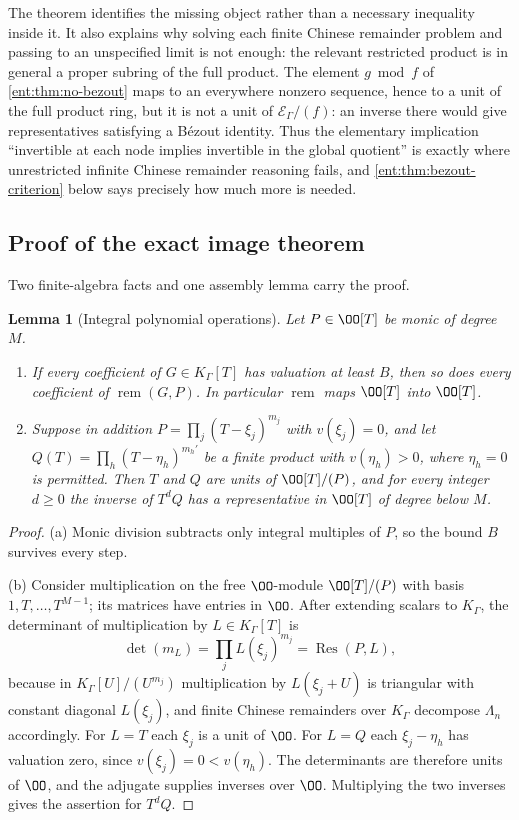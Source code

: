 \documentclass[11pt]{article}
\theoremstyle{plain}
\newtheorem{lemma}[lemma]{Lemma}
\theoremstyle{plain}
\theoremstyle{plain}
\theoremstyle{definition}
\theoremstyle{definition}
\theoremstyle{definition}
\theoremstyle{definition}
\theoremstyle{remark}
\newcommand{\K}{K_\Gamma}\newcommand{\KD}{K_\Delta}
\newcommand{\E}{\mathcal E_\Gamma}
\DeclareMathOperator{\remp}{rem}\DeclareMathOperator{\Res}{Res}
\begin{document}
The theorem identifies the missing object rather than a necessary inequality
inside it. It also explains why solving each finite Chinese remainder problem
and passing to an unspecified limit is not enough: the relevant restricted
product is in general a proper subring of the full product. The element
$g\bmod f$ of \cref{ent:thm:no-bezout} maps to an everywhere nonzero
sequence, hence to a unit of the full product ring, but it is not a unit of
$\E/(f)$: an inverse there would give representatives satisfying a B\'ezout
identity. Thus the elementary implication ``invertible at each node implies
invertible in the global quotient'' is exactly where unrestricted infinite
Chinese remainder reasoning fails, and \cref{ent:thm:bezout-criterion} below
says precisely how much more is needed.

\subsection{Proof of the exact image theorem}
\label{ent:subsec:image-proof}
Two finite-algebra facts and one assembly lemma carry the proof.

\begin{lemma}[Integral polynomial operations]\label{ent:lem:integral}
Let $P\in\OO[T]$ be monic of degree $M$.
\begin{enumerate}[label=\textnormal{(\alph*)},leftmargin=2em]
\item If every coefficient of $G\in\K[T]$ has valuation at least $B$, then so
does every coefficient of $\remp(G,P)$. In particular $\remp$ maps $\OO[T]$
into $\OO[T]$.
\item Suppose in addition $P=\prod_j(T-\xi_j)^{m_j}$ with $v(\xi_j)=0$, and
let $Q(T)=\prod_h(T-\eta_h)^{m_h'}$ be a finite product with $v(\eta_h)>0$,
where $\eta_h=0$ is permitted. Then $T$ and $Q$ are units of $\OO[T]/(P)$,
and for every integer $d\ge0$ the inverse of $T^dQ$ has a representative in
$\OO[T]$ of degree below $M$.
\end{enumerate}
\end{lemma}
\begin{proof}
(a) Monic division subtracts only integral multiples of $P$, so the bound $B$
survives every step.

(b) Consider multiplication on the free $\OO$-module $\OO[T]/(P)$ with basis
$1,T,\ldots,T^{M-1}$; its matrices have entries in $\OO$. After extending
scalars to $\K$, the determinant of multiplication by $L\in\K[T]$ is
\begin{equation}\label{ent:eq:detnorm}
 \det(m_L)=\prod_jL(\xi_j)^{m_j}=\Res(P,L),
\end{equation}
because in $\K[U]/(U^{m_j})$ multiplication by $L(\xi_j+U)$ is triangular
with constant diagonal $L(\xi_j)$, and finite Chinese remainders over $\K$
decompose $\Lambda_n$ accordingly. For $L=T$ each $\xi_j$ is a unit of $\OO$.
For $L=Q$ each $\xi_j-\eta_h$ has valuation zero, since $v(\xi_j)=0<v(\eta_h)$.
The determinants are therefore units of $\OO$, and the adjugate supplies
inverses over $\OO$. Multiplying the two inverses gives the assertion for
$T^dQ$.
\end{proof}
\end{document}
